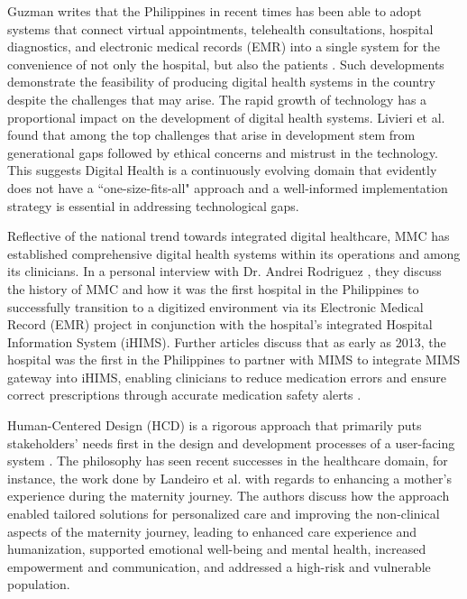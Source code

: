 \documentclass[11pt,a4paper,titlepage]{article}
\begin{document}
	Guzman \cite{guzman_2025_first} writes that the Philippines in recent times has been able to adopt systems that connect virtual appointments, telehealth consultations, hospital diagnostics, and electronic medical records (EMR) into a single system for the convenience of not only the hospital, but also the patients . Such developments demonstrate the feasibility of producing digital health systems in the country despite the challenges that may arise. The rapid growth of technology has a proportional impact on the development of digital health systems. Livieri et al. \cite{livieri_2025_the} found that among the top challenges that arise in development stem from generational gaps followed by ethical concerns and mistrust in the technology. This suggests Digital Health is a continuously evolving domain that evidently does not have a ``one-size-fits-all" approach and a well-informed implementation strategy is essential in addressing technological gaps. 
	
	Reflective of the national trend towards integrated digital healthcare, MMC has established comprehensive digital health systems within its operations and among its clinicians.  In a personal interview with Dr. Andrei Rodriguez \cite{Rodriguez_A}, they discuss the history of MMC and how it was the first hospital in the Philippines to successfully transition to a digitized environment via its Electronic Medical Record (EMR) project in conjunction with the hospital's integrated Hospital Information System (iHIMS). Further articles discuss that as early as 2013, the hospital was the first in the Philippines to partner with MIMS to integrate MIMS gateway into iHIMS, enabling clinicians to reduce medication errors and ensure correct prescriptions through accurate medication safety alerts \cite{mimspteltd_2016_mims,makatimedicalcenter_2016_makati}.
	
	Human-Centered Design (HCD) is a rigorous approach that primarily puts stakeholders' needs first in the design and development processes of a user-facing system \cite{leary_2022_an}. The philosophy has seen recent successes in the healthcare domain, for instance, the work done by Landeiro et al. \cite{landeiro_2025_humancentered} with regards to enhancing a mother's experience during the maternity journey. The authors discuss how the approach enabled tailored solutions for personalized care and improving the non-clinical aspects of the maternity journey, leading to enhanced care experience and humanization, supported emotional well-being and mental health, increased empowerment and communication, and addressed a high-risk and vulnerable population. 
\end{document}
